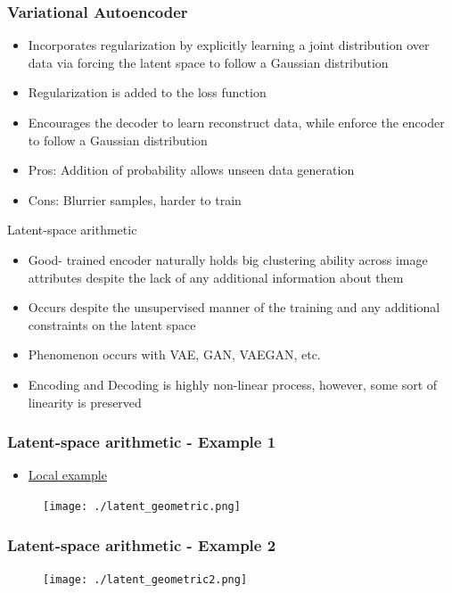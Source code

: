 \begin{frame}
\frametitle{Variational Autoencoder}
\begin{itemize}
	\item Incorporates regularization by explicitly learning a joint distribution over data via forcing the latent space to follow a Gaussian distribution
	\item Regularization is added to the loss function
	\item Encourages the decoder to learn reconstruct data, while enforce the encoder to follow a Gaussian distribution
	\item Pros: Addition of probability allows unseen data generation 
	\item Cons: Blurrier samples, harder to train
\end{itemize}

\end{frame}

\begin{frame}{Latent-space arithmetic}
	\begin{itemize}
		\item Good- trained encoder naturally holds big clustering ability across image attributes despite the lack
		of any additional information about them
		\item Occurs despite the unsupervised manner of the training and any additional constraints on the latent space
		\item Phenomenon occurs with VAE, GAN, VAEGAN, etc.
		\item Encoding and Decoding is highly non-linear process, however, some sort of linearity is preserved 
	\end{itemize}
\end{frame}

\begin{frame}
\frametitle{Latent-space arithmetic - Example 1}
\begin{itemize}
	\item \href{C:/Python36/Scripts/MPV}{Local example}
\end{itemize}
\begin{figure}[!ht]
	\centering
	\texttt{[image: ./latent\_geometric.png]}
\end{figure}
\end{frame}

\begin{frame}
\frametitle{Latent-space arithmetic - Example 2}
\begin{figure}[!ht]
	\centering
	\texttt{[image: ./latent\_geometric2.png]}
\end{figure}
\end{frame}

